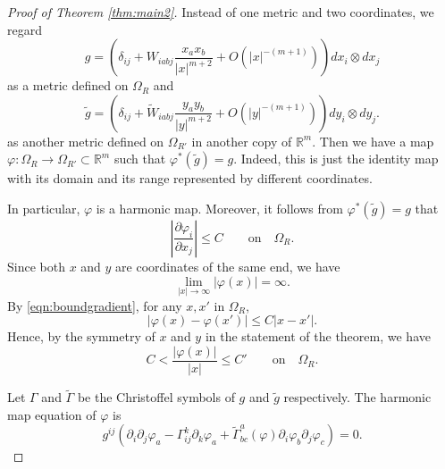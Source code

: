 \documentclass{amsart}
\newcommand{\abs}[1]{\left\vert#1\right\vert}
\newcommand{\Real}{\mathbb R}
\newcommand{\pfrac}[2]{\frac{\partial #1}{\partial #2}}
\numberwithin{equation}{section}
\begin{document}
\begin{proof}[Proof of Theorem \ref{thm:main2}]
	Instead of one metric and two coordinates, we regard	
	\[
		g= (\delta_{ij}+W_{iabj}\frac{x_ax_b}{\abs{x}^{m+2}}+O(\abs{x}^{-(m+1)})) dx_i\otimes dx_j	
	\]
	as a metric defined on $\Omega_R$ and
	\[
		\tilde{g}= (\delta_{ij}+\tilde{W}_{iabj}\frac{y_ay_b}{\abs{y}^{m+2}}+O(\abs{y}^{-(m+1)})) dy_i\otimes dy_j.
	\]
	as another metric defined on $\Omega_{R'}$ in another copy of $\Real^m$. Then we have a map $\varphi:\Omega_R\to\Omega_{R'}\subset \Real^m$ such that $\varphi^*(\tilde{g})=g$. Indeed, this is just the identity map with its domain and its range represented by different coordinates.

	In particular, $\varphi$ is a harmonic map. Moreover, it follows from $\varphi^*(\tilde{g})=g$ that
	\begin{equation}
		\label{eqn:boundgradient}
		\abs{\pfrac{\varphi_i}{x_j}}\leq C \qquad \text{on} \quad \Omega_R.
	\end{equation}
	Since both $x$ and $y$ are coordinates of the same end, we have
	\[
		\lim_{\abs{x}\to \infty } \abs{\varphi(x)} =\infty.
	\]
	By \eqref{eqn:boundgradient}, for any $x,x'$ in $\Omega_R$,
	\[
		\abs{\varphi(x)-\varphi(x')}\leq C \abs{x-x'}.
	\]
	Hence, by the symmetry of $x$ and $y$ in the statement of the theorem, we have
	\begin{equation}
		\label{eqn:compare}
		C<\frac{\abs{\varphi(x)}}{\abs{x}}\leq C'\qquad \text{on} \quad \Omega_R.
	\end{equation}

	Let $\Gamma$ and $\tilde{\Gamma}$ be the Christoffel symbols of $g$ and $\tilde{g}$ respectively. The harmonic map equation of $\varphi$ is
	\begin{equation}
		\label{eqn:hme}
		g^{ij}\left( \partial_i \partial_j\varphi_a  - \Gamma^k_{ij} \partial_k{\varphi_a} + \tilde{\Gamma}^a_{bc}(\varphi)\partial_i \varphi_b \partial_j \varphi_c \right) =0.
	\end{equation}


\end{proof}
\end{document}
